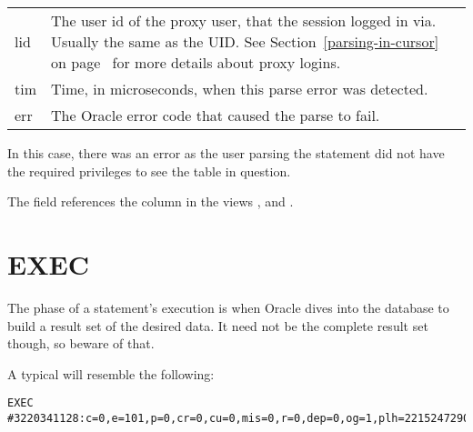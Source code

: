 \begin{longtable}[]{@{}l|l@{}}
\begin{minipage}[t]{0.14\columnwidth}\raggedright\strut
lid\strut
\end{minipage} & \begin{minipage}[t]{0.65\columnwidth}\raggedright\strut
The user id of the proxy user, that the session logged in via. Usually the same as the UID. See Section~\ref{parsing-in-cursor} on page~\pageref{parsing-in-cursor} for more details about proxy logins.\strut
\end{minipage}\tabularnewline
\begin{minipage}[t]{0.14\columnwidth}\raggedright\strut
tim\strut
\end{minipage} & \begin{minipage}[t]{0.65\columnwidth}\raggedright\strut
Time, in microseconds, when this parse error was detected.\strut
\end{minipage}\tabularnewline
\begin{minipage}[t]{0.14\columnwidth}\raggedright\strut
err\strut
\end{minipage} & \begin{minipage}[t]{0.65\columnwidth}\raggedright\strut
The Oracle error code that caused the parse to fail.\strut
\end{minipage}\tabularnewline
\bottomrule
\end{longtable}

In this case, there was an error  as the user parsing the statement did not have the required privileges to see the table in question.

The  field references the column  in the views ,  and .

\newpage\section{EXEC}\label{exec}

The  phase of a statement's execution is when Oracle dives into the database to build a result set of the desired data. It need not be the complete result set though, so beware of that.

A typical  will resemble the following:

\begin{lstlisting}[numbers=none,caption={Exec Line}]
EXEC #3220341128:c=0,e=101,p=0,cr=0,cu=0,mis=0,r=0,dep=0,og=1,plh=2215247290,tim=3520788606189
\end{lstlisting}

